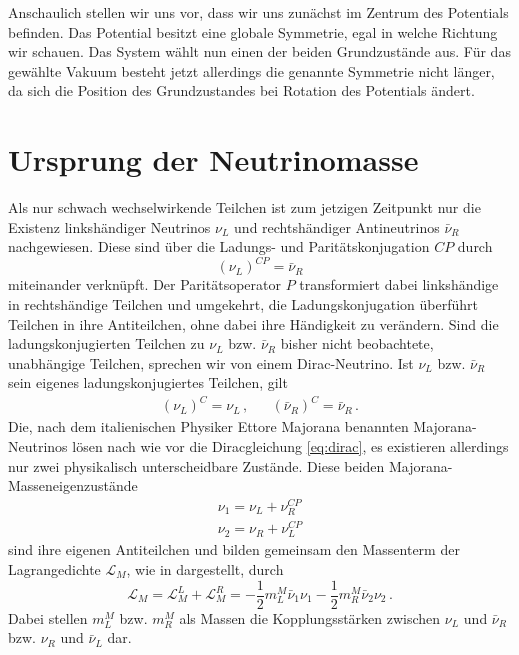 Anschaulich stellen wir uns vor, dass wir uns zunächst im Zentrum des Potentials befinden.
Das Potential besitzt eine globale Symmetrie, egal in welche Richtung wir schauen.
Das System wählt nun einen der beiden Grundzustände aus.
Für das gewählte Vakuum besteht jetzt allerdings die genannte Symmetrie nicht länger, da sich die Position des Grundzustandes bei Rotation des Potentials ändert.


\section{Ursprung der Neutrinomasse} %
\label{sec:neutrinomasse}

Als nur schwach wechselwirkende Teilchen ist zum jetzigen Zeitpunkt nur die Existenz linkshändiger Neutrinos $\nu_L$ und rechtshändiger Antineutrinos $\bar{\nu}_R$ nachgewiesen.
Diese sind über die Ladungs- und Paritätskonjugation $C P$ durch 
\begin{equation}
    (\nu_L)^{C P} = \bar{\nu}_R
    \label{eq:cpkonju}
\end{equation}
miteinander verknüpft.
Der Paritätsoperator $P$ transformiert dabei linkshändige in rechtshändige Teilchen und umgekehrt, die Ladungskonjugation überführt Teilchen in ihre Antiteilchen, ohne dabei ihre Händigkeit zu verändern.
Sind die ladungskonjugierten Teilchen zu $\nu_L$ bzw. $\bar{\nu}_R$ bisher nicht beobachtete, unabhängige Teilchen, sprechen wir von einem Dirac-Neutrino.
Ist $\nu_L$ bzw. $\bar{\nu}_R$ sein eigenes ladungskonjugiertes Teilchen, gilt
\begin{align*}
    (\nu_L)^C = \nu_L \,, && (\bar{\nu}_R)^C = \bar{\nu}_R \,.
\end{align*}
Die, nach dem italienischen Physiker Ettore Majorana benannten Majorana-Neutrinos lösen nach wie vor die Diracgleichung \eqref{eq:dirac}, es existieren allerdings nur zwei physikalisch unterscheidbare Zustände.
Diese beiden Majorana-Masseneigenzustände
\begin{align*}
    \nu_1 = \nu_L + \nu^{C P}_R \\
    \nu_2 = \nu_R + \nu^{C P}_L
\end{align*}
sind ihre eigenen Antiteilchen und bilden gemeinsam den Massenterm der Lagrangedichte $\mathcal{L}_M$, wie in \cite{kleingrot} dargestellt, durch
\begin{equation}
    \mathcal{L}_M = \mathcal{L}^L_M + \mathcal{L}^R_M = -\frac{1}{2} m^M_L \bar{\nu}_1 \nu_1 - \frac{1}{2} m^M_R \bar{\nu}_2 \nu_2 \,.
    \label{eq:lagrangedichtemajo}
\end{equation}
Dabei stellen $m^M_L$ bzw. $m^M_R$ als Massen die Kopplungsstärken zwischen $\nu_L$ und $\bar{\nu}_R$ bzw. $\nu_R$ und $\bar{\nu}_L$ dar.

